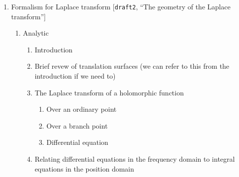 \documentclass{article}
\begin{document}
\begin{enumerate}
\begin{itemize}
\begin{itemize}
\item motivation
\begin{itemize}
\item In the classical theory of special functions, exponential integrals are often used to express solutions of linear differential and difference equations.
\item In physics ??
\item Geometrically they represent a Poincar\'e pairing (as explained by Kontsevich in \textbf{IHES lectures}).
\end{itemize}
\end{itemize}
\item What is the class of ODEs that we study? \textcolor{gray}{has to be done}
\item State results about resurgence of exponential integrals and Stokes phenomena
\begin{itemize}
\item Thimbles integrals [Kontsevich]: geometric computation of Stokes constants \textcolor{gray}{has to be done}
\item ODE and fractional derivative formula [{\tt draft2}]
\item if hypergeometric functions appear in a large class of examples: integral formulas for hypergeometric functions \textcolor{gray}{has to be done}
\end{itemize}
\end{itemize}
\item Formalism for Laplace transform [{\tt draft2}, ``The geometry of the Laplace transform'']
\begin{enumerate}
\item Analytic
\begin{enumerate}
\item Introduction
\item Brief revew of translation surfaces (we can refer to this from the introduction if we need to)
\item The Laplace transform of a holomorphic function
\begin{enumerate}
\item Over an ordinary point
\item Over a branch point
\item Differential equation
\end{enumerate}
\item Relating differential equations in the frequency domain to integral equations in the position domain

\end{enumerate}
\end{enumerate}
\end{enumerate}
\end{document}
